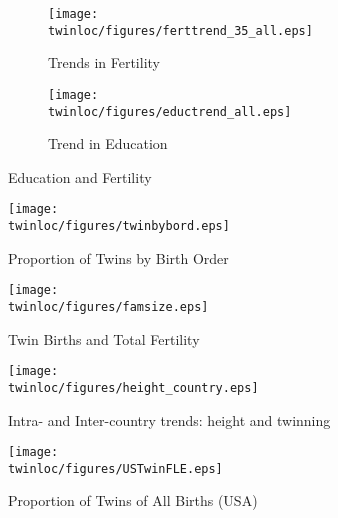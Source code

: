 \begin{figure}[htpb!]
\centering
\begin{subfigure}{.5\textwidth}
  \centering
  \texttt{[image: \\twinloc/figures/ferttrend\_35\_all.eps]}
  \caption{Trends in Fertility}
  \label{TWINfig:fertrend}
\end{subfigure}%
\begin{subfigure}{.5\textwidth}
  \centering
  \texttt{[image: \\twinloc/figures/eductrend\_all.eps]}
  \caption{Trend in Education}
  \label{TWINfig:eductrend}
\end{subfigure}
\caption{Education and Fertility}
\label{TWINfig:trends}
\end{figure}
\vspace{1cm}

\begin{figure}[htpb!]
\begin{center}
\caption{Proportion of Twins by Birth Order}
\label{TWINfig:bord}
\texttt{[image: \\twinloc/figures/twinbybord.eps]} 
\end{center}
\end{figure}

\begin{figure}[htpb!]
\begin{center}
\caption{Twin Births and Total Fertility}
\label{TWINfig:births}
\texttt{[image: \\twinloc/figures/famsize.eps]} 
\end{center}
\end{figure}

\begin{figure}[htpb!]
\begin{center}
\caption{Intra- and Inter-country trends: height and twinning}
\label{TWINfig:arrows}
\texttt{[image: \\twinloc/figures/height\_country.eps]} 
\end{center}
\end{figure}

\begin{figure}[htpb!]
\begin{center}
\caption{Proportion of Twins of All Births (USA)}
\label{TWINfig:USTwin}
\texttt{[image: \\twinloc/figures/USTwinFLE.eps]} 
\end{center}
\end{figure}

